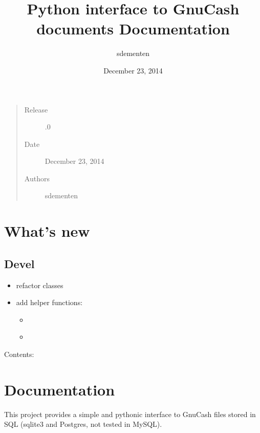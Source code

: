 \documentclass[letterpaper,10pt,english]{sphinxmanual}
\title{Python interface to GnuCash documents Documentation}
\date{December 23, 2014}
\author{sdementen}
\begin{document}
\maketitle
\tableofcontents
{}\label{index::doc}

\begin{quote}\begin{description}
\item[{Release}] .0

\item[{Date}] \leavevmode
December 23, 2014

\item[{Authors}] \leavevmode
sdementen

\end{description}\end{quote}


\chapter{What's new}
\label{news::doc}\label{news:welcome-to-the-piecash-documentation}\label{news:what-s-new}

\section{Devel}
\label{news:devel}\begin{itemize}
\item {} 
refactor classes

\item {} 
add helper functions:
\begin{itemize}
\item {} 
{\hyperref[api/piecash.model_core.commodity:piecash.model_core.commodity.Commodity.create_currency_from_ISO]{}}

\item {} 
{\hyperref[api/piecash.model_core.commodity:piecash.model_core.commodity.Commodity.create_stock_from_symbol]{}}

\end{itemize}

\end{itemize}

Contents:


\chapter{Documentation}
\label{doc/doc:documentation}\label{doc/doc::doc}
This project provides a simple and pythonic interface to GnuCash files stored in SQL (sqlite3 and Postgres, not tested in MySQL).
\end{document}

